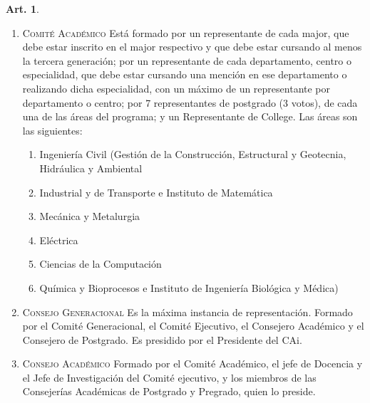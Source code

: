 \documentclass[letterpaper,11pt]{article}
\theoremstyle{definition}%
\newtheorem{art}{Art.} %
\begin{document}
\begin{art}
\begin{enumerate}
		\item \textsc{Comité Académico} Está formado por un representante de cada major, que debe estar inscrito en el major respectivo y que debe estar cursando al menos la tercera generación; por un representante de cada departamento, centro o especialidad, que debe estar cursando una mención en ese departamento o realizando dicha especialidad, con un máximo de un representante por departamento o centro; por 7 representantes de postgrado (3 votos), de cada una de las áreas del programa; y un Representante de College. Las áreas son las siguientes:
		      \begin{enumerate}
			      \item Ingeniería Civil (Gestión de la Construcción, Estructural y Geotecnia, Hidráulica y Ambiental
			      \item Industrial y de Transporte e Instituto de Matemática
			      \item Mecánica y Metalurgia
			      \item Eléctrica
			      \item Ciencias de la Computación
			      \item Química y Bioprocesos e Instituto de Ingeniería Biológica y Médica)
		      \end{enumerate}

		\item \textsc{Consejo Generacional} Es la máxima instancia de representación. Formado por el Comité Generacional, el Comité Ejecutivo, el Consejero Académico y el Consejero de Postgrado. Es presidido por el Presidente del CAi.

		\item \textsc{Consejo Académico} Formado por el Comité Académico, el jefe de Docencia y el Jefe de Investigación del Comité ejecutivo, y los miembros de las Consejerías Académicas de Postgrado y Pregrado, quien lo preside.


\end{enumerate}
\end{art}
\end{document}

